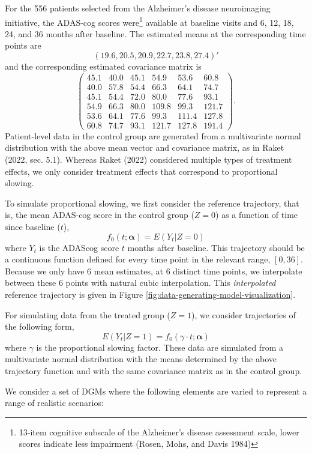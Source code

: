 \documentclass[
]{article}
\begin{document}
For the 556 patients selected from the Alzheimer's disease neuroimaging initiative,
the ADAS-cog scores were\footnote{13-item cognitive subscale of the Alzheimer's disease assessment scale,
  lower scores indicate less impairment (Rosen, Mohs, and Davis 1984)} available at baseline visits and 6, 12, 18, 24, and 36
months after baseline. The estimated means at the corresponding time points are
\[(19.6, 20.5, 20.9, 22.7, 23.8, 27.4)'\]
and the corresponding estimated covariance matrix is
\[\begin{pmatrix}
45.1 & 40.0 & 45.1 & 54.9 & 53.6 & 60.8 \\
40.0 & 57.8 & 54.4 & 66.3 & 64.1 & 74.7 \\
45.1 & 54.4 & 72.0 & 80.0 & 77.6 & 93.1 \\
54.9 & 66.3 & 80.0 & 109.8 & 99.3 & 121.7 \\
53.6 & 64.1 & 77.6 & 99.3 & 111.4 & 127.8 \\
60.8 & 74.7 & 93.1 & 121.7 & 127.8 & 191.4
\end{pmatrix}.\]
Patient-level data in the control group are generated from a multivariate normal
distribution with the above mean vector and covariance matrix, as in
Raket (2022, sec. 5.1). Whereas Raket (2022) considered
multiple types of treatment effects, we only consider treatment effects that
correspond to proportional slowing.

To simulate proportional slowing, we first consider the reference trajectory,
that is, the mean ADAS-cog score in the control group (\(Z = 0\)) as a function of
time since baseline (\(t\)), \[f_{0}(t; \boldsymbol{\alpha}) = E(Y_{t} | Z = 0)\]
where \(Y_t\) is the ADAScog score \(t\) months after baseline. This trajectory
should be a continuous function defined for every time point in the relevant
range, \([0, 36]\). Because we only have 6 mean estimates, at 6 distinct time
points, we interpolate between these 6 points with natural cubic interpolation.
This \emph{interpolated} reference trajectory is given in Figure
\ref{fig:data-generating-model-visualization}.

For simulating data from the treated group (\(Z = 1\)), we consider trajectories of the
following form, \[E(Y_t | Z = 1) = f_0(\gamma \cdot t; \boldsymbol{\alpha}) \]
where \(\gamma\) is the proportional slowing factor. These data are simulated from
a multivariate normal distribution with the means determined by the above
trajectory function and with the same covariance matrix as in the control group.

We consider a set of DGMs where the following elements are varied to represent
a range of realistic scenarios:
\end{document}
